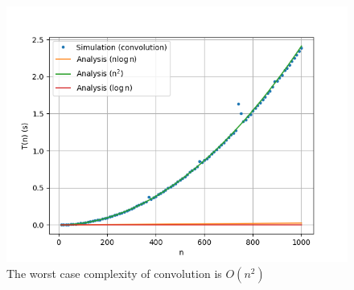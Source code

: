 \documentclass[journal,12pt,twocolumn]{IEEEtran}
\renewcommand\thesection{\arabic{section}}
\begin{document}
\begin{enumerate}[label=\thesection.\arabic*]
\begin{figure}[!htb]
	\includegraphics[width=\columnwidth]{figs/6_7_2.png}
	\caption{The worst case complexity of convolution is $O(n^2)$}
	\label{fig:nsq}
\end{figure}
\end{enumerate}
\end{document}
